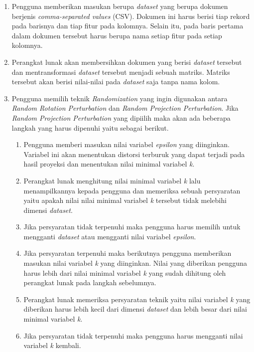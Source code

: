 \begin{enumerate}
    \item Pengguna memberikan masukan berupa \textit{dataset} yang berupa dokumen berjenis \textit{comma-separated values} (CSV). Dokumen ini harus berisi tiap rekord pada barisnya dan tiap fitur pada kolomnya. Selain itu, pada baris pertama dalam dokumen tersebut harus berupa nama setiap fitur pada setiap kolomnya.
    \item Perangkat lunak akan membersihkan dokumen yang berisi \textit{dataset} tersebut dan mentransformasi \textit{dataset} tersebut menjadi sebuah matriks. Matriks tersebut akan berisi nilai-nilai pada \textit{dataset} saja tanpa nama kolom.
    \item Pengguna memilih teknik \textit{Randomization} yang ingin digunakan antara \textit{Random Rotation Perturbation} dan \textit{Random Projection Perturbation}. Jika \textit{Random Projection Perturbation} yang dipiilih maka akan ada beberapa langkah yang harus dipenuhi yaitu sebagai berikut.
    \begin{enumerate}
        \item Pengguna memberi masukan nilai variabel \textit{epsilon} yang diinginkan. Variabel ini akan menentukan distorsi terburuk yang dapat terjadi pada hasil proyeksi dan menentukan nilai minimal variabel \textit{k}.
        \item Perangkat lunak menghitung nilai minimal variabel \textit{k} lalu menampilkannya kepada pengguna dan memeriksa sebuah persyaratan yaitu apakah nilai nilai minimal variabel \textit{k} tersebut tidak melebihi dimensi \textit{dataset}.
        \item Jika persyaratan tidak terpenuhi maka pengguna harus memilih untuk mengganti \textit{dataset} atau mengganti nilai variabel \textit{epsilon}.
        \item Jika persyaratan terpenuhi maka berikutnya pengguna memberikan masukan nilai variabel \textit{k} yang diinginkan. Nilai yang diberikan pengguna harus lebih dari nilai minimal variabel \textit{k} yang sudah dihitung oleh perangkat lunak pada langkah sebelumnya.
        \item Perangkat lunak memeriksa persyaratan teknik yaitu nilai variabel \textit{k} yang diberikan harus lebih kecil dari dimensi \textit{dataset} dan lebih besar dari nilai minimal variabel \textit{k}.
        \item Jika persyaratan tidak terpenuhi maka pengguna harus mengganti nilai variabel \textit{k} kembali.
    \end{enumerate}

\end{enumerate}
